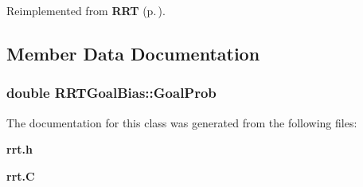 Reimplemented from {\bf RRT} {\rm (p.\,\pageref{classRRT_b4})}.

\subsection{Member Data Documentation}
\subsubsection{\setlength{\rightskip}{0pt plus 5cm}double RRTGoal\-Bias::Goal\-Prob}\label{classRRTGoalBias_m0}




The documentation for this class was generated from the following files:\begin{CompactItemize}
\item 
{\bf rrt.h}\item 
{\bf rrt.C}\end{CompactItemize}
